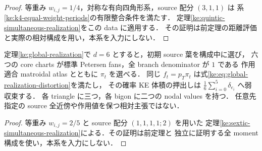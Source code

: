 \begin{proof}
等重み $w_{i,j}=1/4$，対称な有向四角形系，source 配分 $(3,1,1)$ は
系\ref{ke:k4-equal-weight-periods}の有限整合条件を満たす．
定理\ref{ke:quintic-simultaneous-realization}をこの data に適用する．
その証明は前定理の距離評価と実際の相対構成を用い，本系を入力にしない．
\end{proof}

\begin{corollary}
\label{ke:sextic-simultaneous-main}
定理\ref{ke:global-realization}で $d=6$ とすると，初期 source 葉を構成中に選び，
六つの core charts が標準 Petersen fans，全 branch denominator が $1$ である
作用適合 matroidal atlas とともに $\pi_t$ を選べる．
同じ $f_t=p_T\pi_t$ は式\eqref{ke:eq:global-realization-distortion}を満たし，
その確率 KE 体積の押出しは $\frac16\sum_{i=0}^5\delta_{e_i}$ へ弱収束する．
各 triangle に三つ，各 bigon に二つの nodal values を持つ．
任意先指定の source 全近傍や作用値を保つ相対主張ではない．
\end{corollary}

\begin{proof}
等重み $w_{i,j}=2/5$ と source 配分 $(1,1,1,1;2)$ を用いた
定理\ref{ke:sextic-simultaneous-realization}による．その証明は前定理と
独立に証明する全 moment 構成を使い，本系を入力にしない．
\end{proof}

